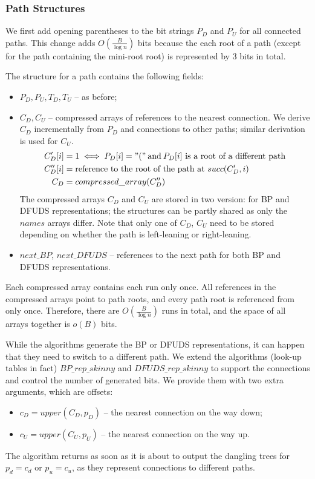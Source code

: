 \subsubsection{Path Structures}

We first add opening parentheses to the bit strings $P_D$ and $P_U$ for all connected paths.
This change adds $O(\frac{B}{\log n})$ bits because the each root of a path (except for the path containing the mini-root root) is represented by $3$ bits in total.

The structure for a path contains the following fields:
\begin{itemize}
	\item $P_D, P_U, T_D, T_U$ -- as before;
	\item $C_D, C_U$ -- compressed arrays of references to the nearest connection.
	We derive $C_D$ incrementally from $P_D$ and connections to other paths; similar derivation is used for $C_U$.
	\begin{align*}
		C'_D[i] &= 1 \iff P_D[i] = "(" \booland P_D[i]\ \textrm{is a root of a different path} \\
		C''_D[i] &= \textrm{reference to the root of the path at}\ succ(C'_D, i) \\
		C_D &= compressed\_array(C''_D)
	\end{align*}
	The compressed arrays $C_D$ and $C_U$ are stored in two version: for BP and DFUDS representations; the structures can be partly shared as only the $names$ arrays differ.
	Note that only one of $C_D$, $C_U$ need to be stored depending on whether the path is left-leaning or right-leaning.
	\item $next\_BP$, $next\_DFUDS$ -- references to the next path for both BP and DFUDS representations.
\end{itemize}

Each compressed array contains each run only once.
All references in the compressed arrays point to path roots, and every path root is referenced from only once.
Therefore, there are $O(\frac{B}{\log n})$ runs in total, and the space of all arrays together is $o(B)$ bits.

While the algorithms generate the BP or DFUDS representations, it can happen that they need to switch to a different path.
We extend the algorithms (look-up tables in fact) $BP\_rep\_skinny$ and $DFUDS\_rep\_skinny$ to support the connections and control the number of generated bits.
We provide them with two extra arguments, which are offsets:
\begin{itemize}
	\item $c_D = upper(C_D, p_D)$ -- the nearest connection on the way down;
	\item $c_U = upper(C_U, p_U)$ -- the nearest connection on the way up.
\end{itemize}
The algorithm returns as soon as it is about to output the dangling trees for $p_d = c_d$ or $p_u = c_u$, as they represent connections to different paths.


